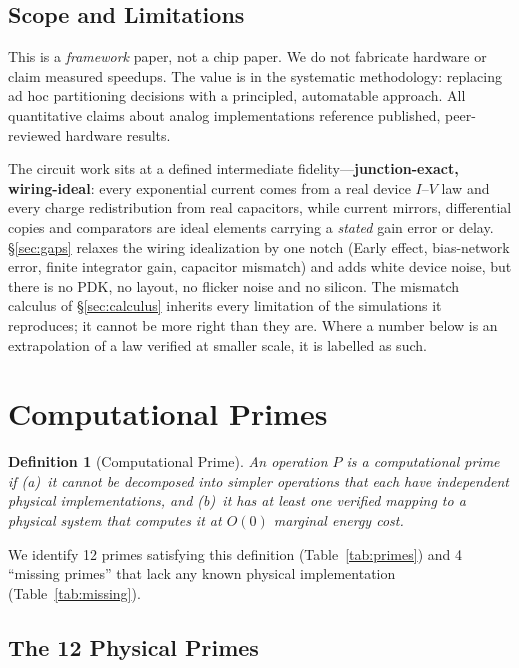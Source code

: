 \documentclass[11pt]{article}
\newtheorem{definition}{Definition}
\begin{document}
\subsection{Scope and Limitations}

This is a \textit{framework} paper, not a chip paper. We do not fabricate hardware or claim measured speedups. The value is in the systematic methodology: replacing ad hoc partitioning decisions with a principled, automatable approach. All quantitative claims about analog implementations reference published, peer-reviewed hardware results.

The circuit work sits at a defined intermediate fidelity---\textbf{junction-exact, wiring-ideal}: every exponential current comes from a real device $I$--$V$ law and every charge redistribution from real capacitors, while current mirrors, differential copies and comparators are ideal elements carrying a \textit{stated} gain error or delay. \S\ref{sec:gaps} relaxes the wiring idealization by one notch (Early effect, bias-network error, finite integrator gain, capacitor mismatch) and adds white device noise, but there is no PDK, no layout, no flicker noise and no silicon. The mismatch calculus of \S\ref{sec:calculus} inherits every limitation of the simulations it reproduces; it cannot be more right than they are. Where a number below is an extrapolation of a law verified at smaller scale, it is labelled as such.

\section{Computational Primes}
\label{sec:primes}

\begin{definition}[Computational Prime]
An operation $P$ is a computational prime if (a)~it cannot be decomposed into simpler operations that each have independent physical implementations, and (b)~it has at least one verified mapping to a physical system that computes it at $O(0)$ marginal energy cost.
\end{definition}

We identify 12 primes satisfying this definition (Table~\ref{tab:primes}) and 4 ``missing primes'' that lack any known physical implementation (Table~\ref{tab:missing}).

\subsection{The 12 Physical Primes}
\end{document}
